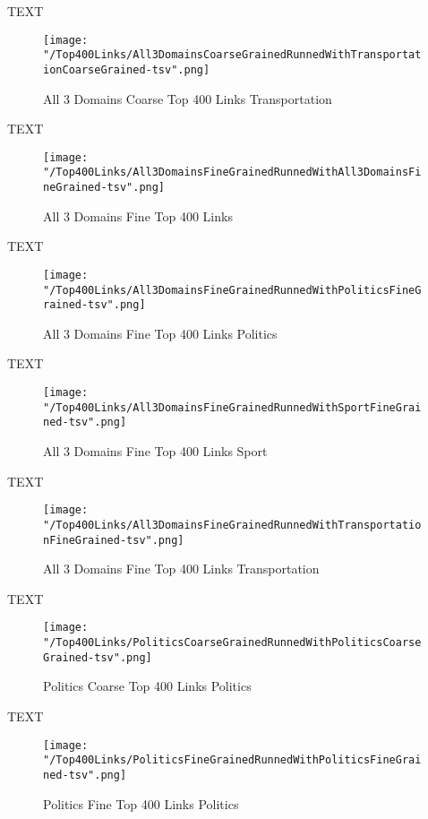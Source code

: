 \documentclass[thesis=M,english]{FITthesis}[2018/05/30]
\begin{document}
		TEXT	

	\begin{figure}\centering
		\texttt{[image: "/Top400Links/All3DomainsCoarseGrainedRunnedWithTransportationCoarseGrained-tsv".png]}
		\caption{All 3 Domains Coarse Top 400 Links Transportation}\label{}	
	\end{figure}
		
		TEXT	

	\begin{figure}\centering
		\texttt{[image: "/Top400Links/All3DomainsFineGrainedRunnedWithAll3DomainsFineGrained-tsv".png]}
		\caption{All 3 Domains Fine Top 400 Links }\label{}	
	\end{figure}
	
	TEXT

	\begin{figure}\centering
		\texttt{[image: "/Top400Links/All3DomainsFineGrainedRunnedWithPoliticsFineGrained-tsv".png]}
		\caption{All 3 Domains Fine Top 400 Links Politics}\label{}
	\end{figure}	

	TEXT	

	\begin{figure}\centering
		\texttt{[image: "/Top400Links/All3DomainsFineGrainedRunnedWithSportFineGrained-tsv".png]}
		\caption{All 3 Domains Fine Top 400 Links Sport}\label{}
	\end{figure}
	
		TEXT	

	\begin{figure}\centering
		\texttt{[image: "/Top400Links/All3DomainsFineGrainedRunnedWithTransportationFineGrained-tsv".png]}
		\caption{All 3 Domains Fine Top 400 Links Transportation}\label{}	
	\end{figure}
	
	TEXT

	\begin{figure}\centering
		\texttt{[image: "/Top400Links/PoliticsCoarseGrainedRunnedWithPoliticsCoarseGrained-tsv".png]}
		\caption{Politics Coarse Top 400 Links Politics}\label{}
	\end{figure}	

	TEXT	

	\begin{figure}\centering
		\texttt{[image: "/Top400Links/PoliticsFineGrainedRunnedWithPoliticsFineGrained-tsv".png]}
		\caption{Politics Fine Top 400 Links Politics}\label{}
	\end{figure}
\end{document}
